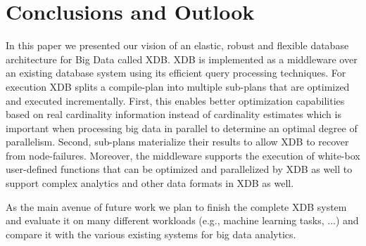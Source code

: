 \documentclass{sig-alternate}
\begin{document}
\section{Conclusions and Outlook}
\label{sec:concl}

In this paper we presented our vision of an elastic, robust and flexible database architecture for Big Data called XDB. XDB is implemented as a middleware over an existing database system using its efficient query processing techniques. 
For execution XDB splits a compile-plan into multiple sub-plans that are optimized and executed incrementally. First, this enables better optimization capabilities based on real cardinality information instead of cardinality estimates which is important when processing big data in parallel to determine an optimal degree of parallelism. Second, sub-plans materialize their results to allow XDB to recover from node-failures. Moreover, the middleware supports the execution of white-box user-defined functions that can be optimized and parallelized by XDB as well to support complex analytics and other data formats in XDB as well.

As the main avenue of future work we plan to finish the complete XDB system and evaluate it on many different workloads (e.g., machine learning tasks, ...) and compare it with the various existing systems for big data analytics.


\small
\end{document}
